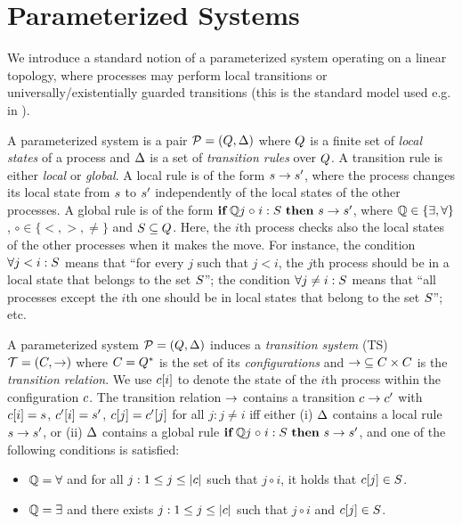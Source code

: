 %
\section{Parameterized Systems}
\label{section:parameterized_systems}

We introduce a standard notion of a parameterized system operating on
a linear topology, where processes may perform local transitions or
universally/existentially guarded transitions (this is the standard
model used e.g. in
\cite{PRZ-tacas01,CTV06,rmc:wo:transducers,Namjoshi:VMCAI07}).

A parameterized system is a pair ${\mathcal P}=(Q,\Delta)$ where
$Q$ is a finite set of \emph{local states} of a process and
$\Delta$ is a set of \emph{transition rules} over $Q$.  A
transition rule is either {\it local} or {\it global}.
%
A local rule is of the form $s\rightarrow s'$, where the process
changes its local state from $s$ to $s'$ independently of the
local states of the other processes.
%
A global rule is of the form $\quantrule\loc{\loc'}{\quantify}\circ
S$, where $\mathbb{Q}\in\{\exists,\forall\}$, $\circ\in\{<,>,\neq\}$
and $S\subseteq Q$.
%
Here, the $i$th process checks also the local states of the other
processes when it makes the move.
%
For instance, the condition $\forall j< i: S$ means that ``for
every $j$ such that $j< i$, the $j$th process should be in a local
state that belongs to the set $S$''; the condition $\forall
j\neq i: S$ means that ``all processes except the $i$th one
should be in local states that belong to the set $S$''; etc.

A parameterized system ${\mathcal P} =(Q,\Delta)$ induces a
\emph{transition system} (TS) ${\mathcal T} = (C,\rightarrow)$ where $C =
Q^*$ is the set of its \emph{configurations} and ${\rightarrow}
\subseteq C\times C$ is the \emph{transition relation}. We use
$c[i]$ to denote the state of the $i$th process within the
configuration $c$.
%
The transition relation $\rightarrow$ contains a transition
$c\rightarrow c'$ with $c[i] = s$, $c'[i] = s'$,
$c[j]=c'[j]$ for all $j:j\neq i$ iff either (i) $\Delta$
contains a local rule $s\rightarrow s'$, or (ii) $\Delta$ contains a
global rule $\quantrule\loc{\loc'}{\quantify}\circ S$, and one of the
following conditions is satisfied:
\begin{itemize}%
\item 
$\mathbb{Q}=\forall$ and for all $j:1\leq j\leq |c|$ such that $j\circ i$, it holds that $c[j]\in S$.
\item 
$\mathbb{Q}=\exists$ and there exists $j:1\leq j\leq |c|$ such that $j\circ i$ and $c[j]\in S$.
\end{itemize}

